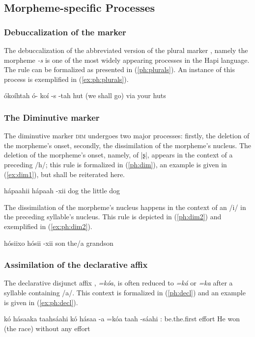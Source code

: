 \documentclass[a4paper, 12pt, oneside]{memoir}
\newcommand{\emh}[1]{\textit{#1}}
\begin{document}
\subsection{Morpheme-specific Processes}\label{morphophonomorphemespecific}
\subsubsection{Debuccalization of the marker \texorpdfstring{\Pl}{PL}}\label{morphophonoplural}
The debuccalization of the abbreviated version of the plural marker \Pl, namely the morpheme \emh{-s} is one of the most widely appearing processes in the Hapi language. The rule can be formalized as presented in (\ref{ph:plurals}). An instance of this process is exemplified in (\ref{ex:ph:plurals}).
\begin{examples}
\ex \label{ph:plurals} 
\ex \label{ex:ph:plurals}
\words ókoíhtah
\bits ó- koí -s -tah
\gloss {\Ssposs} hut {\Pl} {\Prl}
\tr (we shall go) via your huts
\end{examples}
\subsubsection{The Diminutive marker \texorpdfstring{\Dim}{DIM}}\label{morphophonodim}
The diminutive marker \textsc{dim} undergoes two major processes: firstly, the deletion of the morpheme's onset, secondly, the dissimilation of the morpheme's nucleus. The deletion of the morpheme's onset, namely, of |ʂ|, appears in the context of a preceding /h/; this rule is formalized in (\ref{ph:dim}), an example is given in (\ref{ex:dim1}), but shall be reiterated here. 
\begin{examples}
\ex \label{ph:dim} 
\ex \label{ex:ph:dim}
\words hápaahii
\bits hápaah -xii
\gloss dog {\Dim}
\tr the little dog
\end{examples}
The dissimilation of the morpheme's nucleus happens in the context of an /i/ in the preceding syllable's nucleus. This rule is depicted in (\ref{ph:dim2}) and exemplified in (\ref{ex:ph:dim2}).
\begin{examples}
\ex \label{ph:dim2} 
\ex \label{ex:ph:dim2} 
\words hósiixo
\bits hósii -xii
\gloss son {\Dim} 
\tr the/a grandson
\end{examples}
\subsubsection{Assimilation of the declarative affix \texorpdfstring{\Decl}{DECL}}\label{sdeclassim}
The declarative disjunct affix \Decl, \emh{=kóa}, is often reduced to \emh{=ká} or \emh{=ka} after a syllable containing /a/. This context is formalized in (\ref{ph:decl}) and an example is given in (\ref{ex:ph:decl}).
\begin{examples}
\ex \label{ph:decl} 
\ex \label{ex:ph:decl}
\words kó hásaaka taahsáahi
\bits kó hásaa -a =kóa taah -sáahi
\gloss {\Tsm}:{\Subject} be.the.first {\St} {\Decl} effort {\Pvt}
\tr He won (the race) without any effort
\end{examples}
\end{document}
